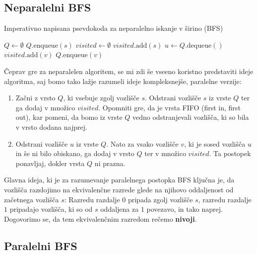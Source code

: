 \documentclass[mat1, tisk]{fmfdelo}
\begin{document}
\subsection{Neparalelni BFS}


\begin{algorithm}[H]
  \caption{Imperativno napisana psevdokoda za neparalelno iskanje v širino (BFS)}
  \label{alg:non_parallel_bfs}
  \begin{algorithmic}[1]
      \State $Q \gets \emptyset$
      \State $Q.\text{enqueue}(s)$
      \State $visited \gets \emptyset$
      \State $visited.\text{add}(s)$
        \State $u \gets Q.\text{dequeue}()$
            \State $visited.\text{add}(v)$
            \State $Q.\text{enqueue}(v)$
          \EndIf
        \EndFor
      \EndWhile
    \EndFunction
  \end{algorithmic}
\end{algorithm}

Čeprav gre za neparalelen algoritem, se mi zdi še vseeno koristno predstaviti ideje algoritma, saj bomo tako lažje 
razumeli ideje kompleksnejše, paralelne verzije:
\begin{enumerate}
  \item Začni z vrsto $Q$, ki vsebuje zgolj vozlišče $s$. Odstrani vozlišče $s$ iz vrste $Q$ ter ga dodaj v množico $visited$.
        Opomniti gre, da je vrsta FIFO (first in, first out), kar pomeni, da bomo iz vrste $Q$ vedno odstranjevali vozlišča, 
        ki so bila v vrsto dodana najprej.
  \item Odstrani vozlišče $u$ iz vrste $Q$. Nato za vsako vozlišče $v$, ki je sosed vozlišča $u$ in še ni bilo obiskano,
        ga dodaj v vrsto $Q$ ter v množico $visited$. Ta postopek ponavljaj, dokler vrsta $Q$ ni prazna.
\end{enumerate}

Glavna ideja, ki je za razumevanje paralelnega postopka BFS ključna je, da vozlišča razslojimo na ekvivalenčne razrede 
glede na njihovo oddaljenost od začetnega vozlišča $s$: Razredu razdalje $0$ pripada zgolj vozlišče $s$, razredu razdalje $1$
pripadajo vozlišča, ki so od $s$ oddaljena za $1$ povezavo, in tako naprej. Dogovorimo se, da tem ekvivalenčnim razredom rečemo \textbf{nivoji}.


\subsection{Paralelni BFS}
\end{document}
